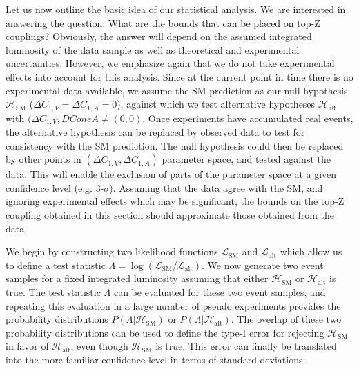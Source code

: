 \documentclass[preprint]{JHEP3} %
\newcommand{\SM}{\mathrm{SM}}
\newcommand{\alt}{\mathrm{alt}}
\def\DConeA{\Delta C_{1,A}}
\def\DConeV{\Delta C_{1,V}}
\def\Halt{\mathcal{H}_{\mathrm{alt}}}
\begin{document}
Let us now outline the basic idea of our statistical analysis.
We are interested in answering the question: What are the bounds that can be placed on top-Z couplings? 
Obviously, the answer will depend on the assumed integrated luminosity of the data sample as well as theoretical and experimental uncertainties. 
However, we emphasize again that we do not take experimental effects into account for this analysis.
Since at the current point in time there is no experimental data available, we assume the SM prediction as our null hypothesis $\mathcal{H}_{\mathrm{SM}}$ ($\DConeV=\DConeA=0$),
against which we test alternative hypotheses $\Halt$ with $(\DConeV,DConeA \ne (0,0)$.
Once experiments have accumulated real events, the alternative hypothesis can be replaced by observed data to test for consistency with the SM prediction. 
The null hypothesis could then be replaced by  other points in $(\DConeV,\DConeA)$ parameter space, and tested against the data. 
This will enable the exclusion of parts of the parameter space at a given confidence level (e.g. 3-$\sigma$). 
Assuming that the data agree with the SM, and ignoring experimental effects which may be significant, the bounds on the top-Z coupling 
obtained in this section should approximate those obtained from the data. 

We begin by constructing two likelihood functions $\mathcal{L}_{\SM}$ and $\mathcal{L}_{\alt}$ which allow us to define a test 
statistic $\Lambda = \log \left( \mathcal{L}_{\SM} / \mathcal{L}_{\alt} \right)$.
We now generate two event samples for a fixed integrated luminosity assuming that either $\mathcal{H}_{\mathrm{SM}}$ or $\Halt$ is true.
The test statistic $\Lambda$ can be evaluated for these two event samples, and 
repeating this evaluation in a large number of pseudo experiments provides the probability distributions $P(\Lambda|\mathcal{H}_{\mathrm{SM}})$ or $P(\Lambda|\Halt)$.
The overlap of these two probability distributions can be used to define the type-I error for rejecting $\mathcal{H}_{\mathrm{SM}}$ in favor of $\Halt$, even though $\mathcal{H}_{\mathrm{SM}}$ is true.
This error can finally be translated into the more familiar confidence level in terms of standard deviations.
\end{document}
